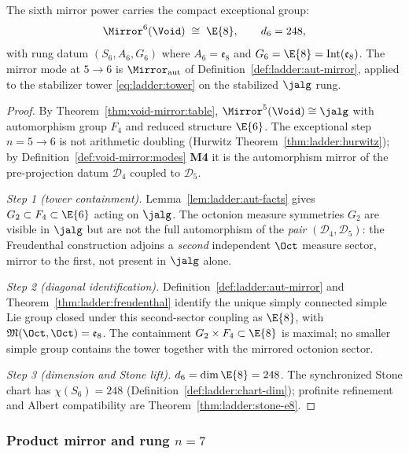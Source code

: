 \begin{theorem}[Exceptional rung $n=6$]\label{thm:ladder:e8}
The sixth mirror power carries the compact exceptional group:
\begin{equation}\label{eq:ladder:mirror6}
  \Mirror^6(\Void)\;\cong\;\E{8},
  \qquad d_6=248,
\end{equation}
with rung datum $(S_6,A_6,G_6)$ where $A_6=\mathfrak{e}_8$ and
$G_6=\E{8}=\mathrm{Int}(\mathfrak{e}_8)$. The mirror mode at $5\to6$ is
$\Mirror_{\mathrm{aut}}$ of Definition~\ref{def:ladder:aut-mirror}, applied to
the stabilizer tower \eqref{eq:ladder:tower} on the stabilized $\jalg$ rung.
\end{theorem}

\begin{proof}
By Theorem~\ref{thm:void-mirror:table}, $\Mirror^5(\Void)\cong\jalg$ with
automorphism group $F_4$ and reduced structure $\E{6}$. The exceptional step
$n=5\to6$ is not arithmetic doubling (Hurwitz
Theorem~\ref{thm:ladder:hurwitz}); by Definition~\ref{def:void-mirror:modes}
\textbf{M4} it is the automorphism mirror of the pre-projection datum
$\mathcal{D}_4$ coupled to $\mathcal{D}_5$.

\emph{Step 1 (tower containment).}
Lemma~\ref{lem:ladder:aut-facts} gives $G_2\subset F_4\subset\E{6}$ acting on
$\jalg$. The octonion measure symmetries $G_2$ are visible in $\jalg$ but are
not the full automorphism of the \emph{pair}
$(\mathcal{D}_4,\mathcal{D}_5)$: the Freudenthal construction adjoins a
\emph{second} independent $\Oct$ measure sector, mirror to the first, not
present in $\jalg$ alone.

\emph{Step 2 (diagonal identification).}
Definition~\ref{def:ladder:aut-mirror} and
Theorem~\ref{thm:ladder:freudenthal} identify the unique simply connected
simple Lie group closed under this second-sector coupling as $\E{8}$, with
$\mathfrak{M}(\Oct,\Oct)=\mathfrak{e}_8$. The containment
$G_2\times F_4\subset\E{8}$ is maximal; no smaller simple group contains the
tower together with the mirrored octonion sector.

\emph{Step 3 (dimension and Stone lift).}
$d_6=\dim\E{8}=248$. The synchronized Stone chart has
$\chi(S_6)=248$ (Definition~\ref{def:ladder:chart-dim}); profinite
refinement and Albert compatibility are Theorem~\ref{thm:ladder:stone-e8}.
\end{proof}

\subsubsection{Product mirror and rung $n=7$}
\label{sec:ladder:mirror-e8e8}

